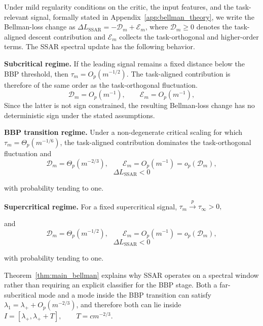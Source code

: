 \begin{theorem}
\label{thm:main_bellman}
Under mild regularity conditions on the critic, the input features, and the
task-relevant signal, formally stated in
Appendix~\ref{app:bellman_theory}, we write the Bellman-loss change as $\Delta L_{\mathrm{SSAR}}
=
-\mathcal{D}_m+\mathcal{E}_m$, where $\mathcal{D}_m\ge 0$ denotes the task-aligned descent contribution and
$\mathcal{E}_m$ collects the task-orthogonal and higher-order terms. The SSAR spectral update has the following
behavior.

\textbf{Subcritical regime.}
If the leading signal remains a fixed distance below the BBP threshold, then $\tau_m=O_p(m^{-1/2})$. The task-aligned contribution is therefore of the same order as the task-orthogonal fluctuation. \begin{equation}
\mathcal{D}_m=O_p(m^{-1}),
\qquad
\mathcal{E}_m=O_p(m^{-1}),
\end{equation}
Since the latter is not sign constrained,
the resulting Bellman-loss change has no deterministic sign under the
stated assumptions.


\textbf{BBP transition regime.}
Under a non-degenerate critical scaling for which $\tau_m=\Theta_p(m^{-1/6})$, the task-aligned contribution dominates the task-orthogonal fluctuation and
\begin{equation}
\mathcal{D}_m=\Theta_p(m^{-2/3}),
\qquad
\mathcal{E}_m=O_p(m^{-1})=o_p(\mathcal{D}_m),
\end{equation}
\begin{equation}
\Delta L_{\mathrm{SSAR}}<
0
\end{equation}

with probability tending to one.

\textbf{Supercritical regime.}
For a fixed supercritical signal, $\tau_m
\xrightarrow{p}
\tau_\infty>0,$


and
\begin{equation}
\mathcal{D}_m=\Theta_p(m^{-1/2}),
\qquad
\mathcal{E}_m=O_p(m^{-1})=o_p(\mathcal{D}_m),
\end{equation}
\begin{equation}
\Delta L_{\mathrm{SSAR}}
<
0
\end{equation}

with probability tending to one.
\end{theorem}

Theorem~\ref{thm:main_bellman} explains why SSAR operates on a spectral
window rather than requiring an explicit classifier for the BBP stage.
Both a far-subcritical mode and a mode inside the BBP transition can satisfy $\lambda_1
=
\lambda_+
+
O_p(m^{-2/3})$,
and therefore both can lie inside $I=[\lambda_+,\lambda_++T],
\qquad
T=cm^{-2/3}.$

